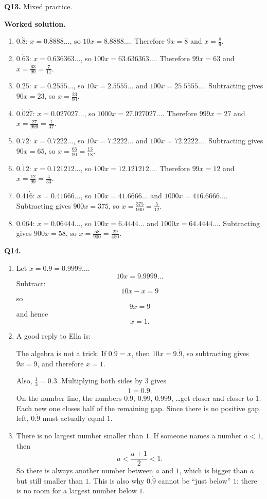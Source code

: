 \documentclass[12pt,a4paper]{article}
\newcommand{\ptitle}[1]{%
  \par\addvspace{12pt}
  \noindent{\color{blue!50!black}\rule{\linewidth}{0.8pt}}\par\nobreak\vspace{2pt}
  \noindent{\large\bfseries\color{blue!50!black}#1}\par\nobreak\vspace{2pt}
  \noindent{\color{blue!50!black}\rule{\linewidth}{0.4pt}}\par\vspace{8pt}}
\newcommand{\wsol}{%
  \par\smallskip
  \noindent\textbf{\color{blue!50!black}Worked solution.}\space}
\begin{document}
\medskip
\noindent\textbf{Q13.} Mixed practice.
\wsol
\begin{enumerate}[label=(\alph*),leftmargin=*]
\item $0.\dot{8}$:
$x=0.8888\ldots$, so $10x=8.8888\ldots$. Therefore $9x=8$ and $x=\frac{8}{9}$.

\item $0.\dot{6}\dot{3}$:
$x=0.636363\ldots$, so $100x=63.636363\ldots$. Therefore $99x=63$ and $x=\frac{63}{99}=\frac{7}{11}$.

\item $0.2\dot{5}$:
$x=0.2555\ldots$, so $10x=2.5555\ldots$ and $100x=25.5555\ldots$. Subtracting gives $90x=23$, so $x=\frac{23}{90}$.

\item $0.\dot{0}2\dot{7}$:
$x=0.027027\ldots$, so $1000x=27.027027\ldots$. Therefore $999x=27$ and $x=\frac{27}{999}=\frac{1}{37}$.

\item $0.7\dot{2}$:
$x=0.7222\ldots$, so $10x=7.2222\ldots$ and $100x=72.2222\ldots$. Subtracting gives $90x=65$, so $x=\frac{65}{90}=\frac{13}{18}$.

\item $0.\dot{1}\dot{2}$:
$x=0.121212\ldots$, so $100x=12.121212\ldots$. Therefore $99x=12$ and $x=\frac{12}{99}=\frac{4}{33}$.

\item $0.41\dot{6}$:
$x=0.41666\ldots$, so $100x=41.6666\ldots$ and $1000x=416.6666\ldots$. Subtracting gives $900x=375$, so $x=\frac{375}{900}=\frac{5}{12}$.

\item $0.06\dot{4}$:
$x=0.06444\ldots$, so $100x=6.4444\ldots$ and $1000x=64.4444\ldots$. Subtracting gives $900x=58$, so $x=\frac{58}{900}=\frac{29}{450}$.
\end{enumerate}

\ptitle{Part 5: Challenges}

\noindent\textbf{Q14.}
\begin{enumerate}[label=(\alph*),leftmargin=*]
\item Let $x=0.\dot{9}=0.9999\ldots$.
\[
10x=9.9999\ldots
\]
Subtract:
\[
10x-x=9
\]
so
\[
9x=9
\]
and hence
\[
x=1.
\]

\item A good reply to Ella is:

The algebra is not a trick. If $0.\dot{9}=x$, then $10x=9.\dot{9}$, so subtracting gives $9x=9$, and therefore $x=1$.

Also, $\frac13=0.\dot{3}$. Multiplying both sides by $3$ gives
\[
1=0.\dot{9}.
\]
On the number line, the numbers $0.9$, $0.99$, $0.999$, \ldots get closer and closer to $1$. Each new one closes half of the remaining gap. Since there is no positive gap left, $0.\dot{9}$ must actually equal $1$.

\item There is no largest number smaller than $1$. If someone names a number $a<1$, then
\[
a<\frac{a+1}{2}<1.
\]
So there is always another number between $a$ and $1$, which is bigger than $a$ but still smaller than $1$. This is also why $0.\dot{9}$ cannot be ``just below'' $1$: there is no room for a largest number below $1$.
\end{enumerate}
\end{document}
